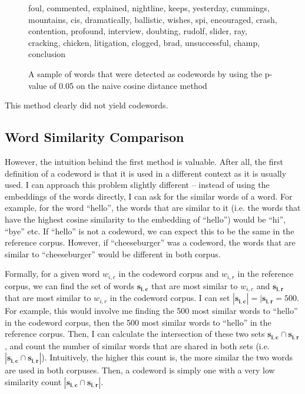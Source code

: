\begin{figure}[H]
foul, commented, explained, nightline, keeps, yesterday, cummings, mountains, cis, dramatically, ballistic, wishes, spi, encouraged, crash, contention, profound, interview, doubting, rudolf, slider, ray, cracking, chicken, litigation, clogged, brad, unsuccessful, champ, conclusion
\caption{A sample of words that were detected as codewords by using the p-value of 0.05 on the naive cosine distance method}
\label{fig-naive-cosine-dist-words}
\end{figure}

This method clearly did not yield codewords.

\subsection{Word Similarity Comparison}

However, the intuition behind the first method is valuable. After all, the first definition of a codeword is that it is used in a different context as it is usually used. I can approach this problem slightly different -- instead of using the embeddings of the words directly, I can ask for the similar words of a word. For example, for the word ``hello'', the words that are similar to it (i.e. the words that have the highest cosine similarity to the embedding of ``hello'') would be ``hi'', ``bye'' etc. If ``hello'' is not a codeword, we can expect this to be the same in the reference corpus. However, if ``cheeseburger'' was a codeword, the words that are similar to ``cheeseburger'' would be different in both corpus.

Formally, for a given word $w_{i, c}$ in the codeword corpus and $w_{i, r}$ in the reference corpus, we can find the set of words $\mathbf{s_{i, c}}$ that are most similar to $w_{i, c}$ and $\mathbf{s_{i ,r}}$ that are most similar to $w_{i, r}$ in the codeword corpus. I can set $|\mathbf{s_{i, c}}| = |\mathbf{s_{i, r}} = 500$. For example, this would involve me finding the 500 most similar words to ``hello'' in the codeword corpus, then the 500 most similar words to ``hello'' in the reference corpus. Then, I can calculate the intersection of these two sets $\mathbf{s_{i ,c}} \cap \mathbf{s_{i ,r}}$, and count the number of similar words that are shared in both sets (i.e. $|\mathbf{s_{i ,c}} \cap \mathbf{s_{i ,r}}|$). Intuitively, the higher this count is, the more similar the two words are used in both corpuses. Then, a codeword is simply one with a very low similarity count $|\mathbf{s_{i ,c}} \cap \mathbf{s_{i ,r}}|$.

